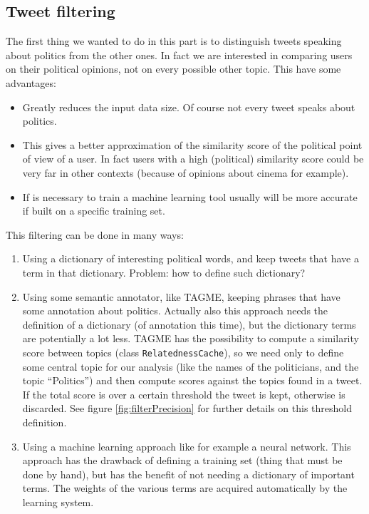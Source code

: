 \documentclass[a4paper,11pt,oneside]{article}
\begin{document}

\subsection{Tweet filtering}
The first thing we wanted to do in this part is to distinguish tweets speaking about politics from the other ones. In fact we are interested in comparing users on their political opinions, not on every possible other topic. This have some advantages:
\begin{itemize}
\item Greatly reduces the input data size. Of course not every tweet speaks about politics.
\item This gives a better approximation of the similarity score of the political point of view of a user. In fact users with a high (political) similarity score could be very far in other contexts (because of opinions about cinema for example).
\item If is necessary to train a machine learning tool usually will be more accurate if built on a specific training set.
\end{itemize}

This filtering can be done in many ways:
\begin{enumerate}
\item Using a dictionary of interesting political words, and keep tweets that have a term in that dictionary. Problem:  how to define such dictionary?
\item Using some semantic annotator, like TAGME, keeping phrases that have some annotation about politics. Actually also this approach needs the definition of a dictionary (of annotation this time), but the dictionary terms are potentially a lot less. TAGME has the possibility to compute a similarity score between topics (class \texttt{RelatednessCache}), so we need only to define some central topic for our analysis (like the names of the politicians, and the topic ``Politics'') and then compute scores against the topics found in a tweet. If the total score is over a certain threshold the tweet is kept, otherwise is discarded. See figure \ref{fig:filterPrecision} for further details on this threshold definition.
\item Using a machine learning approach like for example a neural network. This approach has the drawback of defining a training set (thing that must be done by hand), but has the benefit of not needing a dictionary of important terms. The weights of the various terms are acquired automatically by the learning system.
\end{enumerate}
\end{document}
